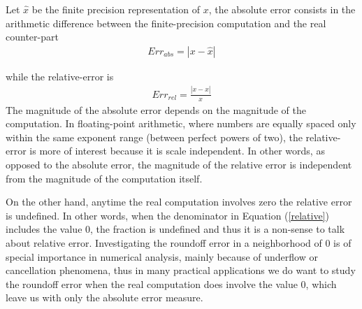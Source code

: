 Let $\widehat{x}$ be the finite precision representation of $x$, the absolute error consists in the arithmetic difference between the finite-precision computation and the real counter-part
%
\begin{align}
Err_{abs}=|x-\widehat{x}|\label{absolute}
\end{align}
%

while the relative-error is 
%
\begin{align}
Err_{rel}=\frac{|x-\widehat{x}|}{x}\label{relative}
\end{align}
%
The magnitude of the absolute error depends on the magnitude of the computation.
%
In floating-point arithmetic, where numbers are equally spaced only within the same exponent range (between perfect powers of two), the relative-error is more of interest because it is scale independent.
%
In other words, as opposed to the absolute error, the magnitude of the relative error is independent from the magnitude of the computation itself.
%

On the other hand, anytime the real computation involves zero the relative error is undefined.
%
In other words, when the denominator in Equation (\ref{relative}) includes the value 0, the fraction is undefined and thus it is a non-sense to talk about relative error.
%
Investigating the roundoff error in a neighborhood of 0 is of special importance in numerical analysis, mainly because of underflow or cancellation phenomena, thus in many practical applications we do want to study the roundoff error when the real computation does involve the value 0, which leave us with only the absolute error measure.
%
